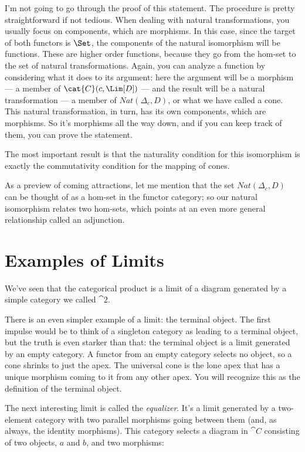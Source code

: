 I'm not going to go through the proof of this statement. The procedure
is pretty straightforward if not tedious. When dealing with natural
transformations, you usually focus on components, which are morphisms.
In this case, since the target of both functors is $\Set$, the
components of the natural isomorphism will be functions. These are
higher order functions, because they go from the hom-set to the set of
natural transformations. Again, you can analyze a function by
considering what it does to its argument: here the argument will be a
morphism --- a member of $\cat{C}(c, \Lim[D])$ --- and the result will
be a natural transformation --- a member of $Nat(\Delta_c, D)$, or
what we have called a cone. This natural transformation, in turn, has
its own components, which are morphisms. So it's morphisms all the way
down, and if you can keep track of them, you can prove the statement.

The most important result is that the naturality condition for this
isomorphism is exactly the commutativity condition for the mapping of
cones.

As a preview of coming attractions, let me mention that the set
$Nat(\Delta_c, D)$ can be thought of as a hom-set in the functor
category; so our natural isomorphism relates two hom-sets, which points
at an even more general relationship called an adjunction.

\section{Examples of Limits}\label{examples-of-limits}

We've seen that the categorical product is a limit of a diagram
generated by a simple category we called $\cat{2}$.

There is an even simpler example of a limit: the terminal object. The
first impulse would be to think of a singleton category as leading to a
terminal object, but the truth is even starker than that: the terminal
object is a limit generated by an empty category. A functor from an
empty category selects no object, so a cone shrinks to just the apex.
The universal cone is the lone apex that has a unique morphism coming to
it from any other apex. You will recognize this as the definition of the
terminal object.

The next interesting limit is called the \emph{equalizer}. It's a limit
generated by a two-element category with two parallel morphisms going
between them (and, as always, the identity morphisms). This category
selects a diagram in $\cat{C}$ consisting of two objects, $a$ and
$b$, and two morphisms:

